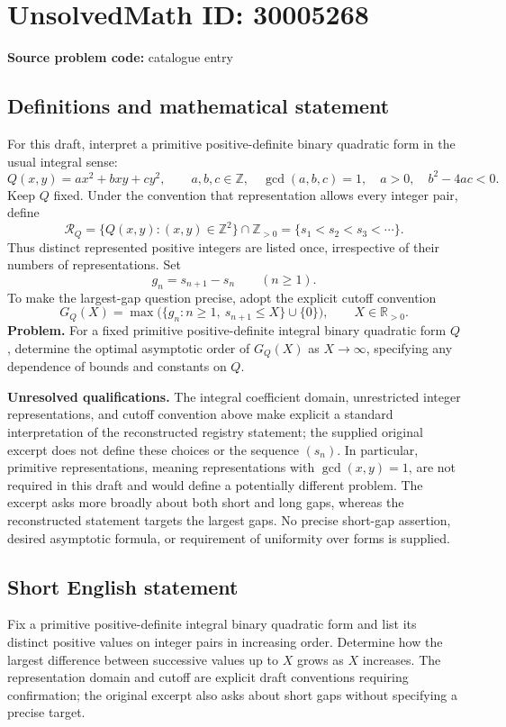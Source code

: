 \documentclass[11pt]{article}
\newcommand{\Z}{\mathbb{Z}}
\newcommand{\R}{\mathbb{R}}
\begin{document}
\section*{UnsolvedMath ID: 30005268}
\textbf{Source problem code:} catalogue entry
\subsection{Definitions and mathematical statement}
For this draft, interpret a primitive positive-definite binary quadratic form in the usual integral sense:
\[
Q(x,y)=ax^2+bxy+cy^2,\qquad a,b,c\in\Z,\quad \gcd(a,b,c)=1,\quad a>0,\quad b^2-4ac<0.
\]
Keep \(Q\) fixed. Under the convention that representation allows every integer pair, define
\[
\mathcal R_Q=\{Q(x,y):(x,y)\in\Z^2\}\cap\Z_{>0}
             =\{s_1<s_2<s_3<\cdots\}.
\]
Thus distinct represented positive integers are listed once, irrespective of their numbers of representations. Set
\[
g_n=s_{n+1}-s_n\qquad(n\geq1).
\]
To make the largest-gap question precise, adopt the explicit cutoff convention
\[
G_Q(X)=\max\bigl(\{g_n:n\geq1,\ s_{n+1}\leq X\}\cup\{0\}\bigr),\qquad X\in\R_{>0}.
\]
\textbf{Problem.} For a fixed primitive positive-definite integral binary quadratic form \(Q\), determine the optimal asymptotic order of \(G_Q(X)\) as \(X\to\infty\), specifying any dependence of bounds and constants on \(Q\).

\textbf{Unresolved qualifications.} The integral coefficient domain, unrestricted integer representations, and cutoff convention above make explicit a standard interpretation of the reconstructed registry statement; the supplied original excerpt does not define these choices or the sequence \((s_n)\). In particular, primitive representations, meaning representations with \(\gcd(x,y)=1\), are not required in this draft and would define a potentially different problem. The excerpt asks more broadly about both short and long gaps, whereas the reconstructed statement targets the largest gaps. No precise short-gap assertion, desired asymptotic formula, or requirement of uniformity over forms is supplied.
\subsection{Short English statement}
Fix a primitive positive-definite integral binary quadratic form and list its distinct positive values on integer pairs in increasing order. Determine how the largest difference between successive values up to \(X\) grows as \(X\) increases. The representation domain and cutoff are explicit draft conventions requiring confirmation; the original excerpt also asks about short gaps without specifying a precise target.
\end{document}
